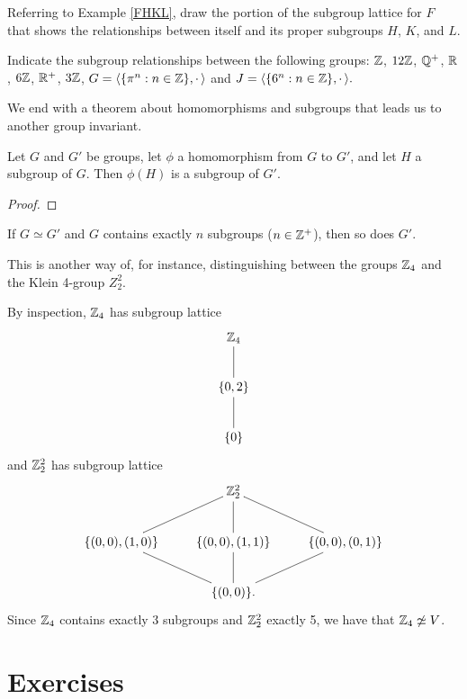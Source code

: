 \begin{example}{} Referring to Example \ref{FHKL}, draw the portion of the subgroup lattice for $F$ that shows the relationships between itself and its proper subgroups $H$, $K$, and $L$. \end{example}


\begin{example}{} Indicate the subgroup relationships between the following groups:
$\mathbb{Z}$, $12\mathbb{Z}$, $\mathbb{Q}^+$, $\mathbb{R}$, $6\mathbb{Z}$, $\mathbb{R}^+$, $3\mathbb{Z}$, $G=\langle\{\pi^n:n\in \mathbb{Z}\},\cdot\,\rangle$
and
$J=\langle\{6^n:n\in \mathbb{Z}\},\cdot\,\rangle. $
\end{example}

 We end with a theorem about homomorphisms and subgroups
that leads us to another group invariant.
\begin{thm}\label{imsubgp} Let $G$ and $G'$ be groups, let $\phi$ a homomorphism from $G$ to $G'$, and let $H$ a subgroup of $G$.  Then $\phi(H)$ is a subgroup of $G'$.
\end{thm}

\begin{proof} \end{proof}

\begin{cor}\label{} If $G\simeq G'$ and $G$ contains exactly $n$ subgroups ($n\in \mathbb{Z}^+$), then so does $G'$.
\end{cor}


This is another way of, for instance, distinguishing between the groups $\mathbb{Z}_4$ and the Klein 4-group $Z_2^2$.


\begin{example}{} By inspection, $\mathbb{Z}_4$ has subgroup lattice
$$\xymatrix{\Z_4 \ar@{-}[d]\\ \{0,2\}\ar@{-}[d]\\ \{0\}} $$ and $\mathbb{Z}_2^2$ has subgroup lattice
$$\xymatrix{&\Z_2^2 \ar@{-}[dl]\ar@{-}[d]\ar@{-}[dr]&\\ \{(0,0),(1,0)\}\ar@{-}[dr]&\{(0,0),(1,1)\}\ar@{-}[d]&\{(0,0),(0,1)\}\ar@{-}[dl]\\ &\{(0,0)\}. &}$$
Since $\mathbb{Z}_4$ contains exactly 3 subgroups and $\mathbb{Z}_2^2$ exactly 5, we have
that $\mathbb{Z}_4\not\simeq V$. \end{example}


\pagebreak
\section{Exercises}


